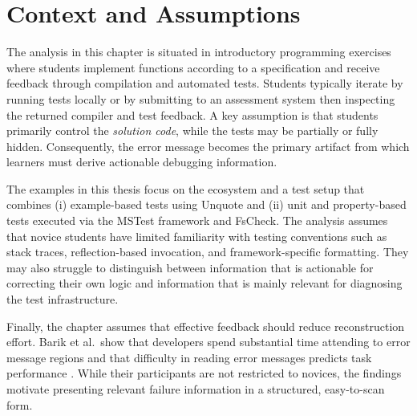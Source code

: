 \section{Context and Assumptions} %
  \label{Context and Assumptions} %


\improve


\begin{justify}
The analysis in this chapter is situated in introductory programming exercises where students
implement functions according to a specification and receive feedback through compilation and
automated tests. Students typically iterate by running tests locally or by submitting to an
assessment system then inspecting the returned compiler and test feedback. A key assumption is that
students primarily control the \emph{solution code}, while the tests may be partially or fully
hidden. Consequently, the error message becomes the primary artifact from which learners must derive
actionable debugging information.

The examples in this thesis focus on the \fs ecosystem and a test setup that combines (i)
example-based tests using Unquote and (ii) unit and property-based tests executed via the MSTest
framework and FsCheck. The analysis assumes that novice students have limited familiarity with
testing conventions such as stack traces, reflection-based invocation, and framework-specific
formatting. They may also struggle to distinguish between information that is actionable for
correcting their own logic and information that is mainly relevant for diagnosing the test
infrastructure.

Finally, the chapter assumes that effective feedback should reduce reconstruction effort.
Barik et al.\ show that developers spend substantial time attending to error message regions and
that difficulty in reading error messages predicts task performance \cite{barik}. While their
participants are not restricted to novices, the findings motivate presenting relevant failure
information in a structured, easy-to-scan form.
\end{justify}


